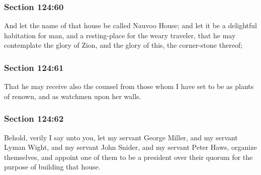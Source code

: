 	\subsubsection{Section 124:60} %
		\label{DC124-60}

		And let the name of that house be called Nauvoo House; and let it be a delightful habitation for man, and a resting-place for the weary traveler, that he may contemplate the glory of Zion, and the glory of this, the corner-stone thereof;


	\subsubsection{Section 124:61} %
		\label{DC124-61}

		That he may receive also the counsel from those whom I have set to be as plants of renown, and as watchmen upon her walls.


	\subsubsection{Section 124:62} %
		\label{DC124-62}

		Behold, verily I say unto you, let my servant George Miller, and my servant Lyman Wight, and my servant John Snider, and my servant Peter Haws, organize themselves, and appoint one of them to be a president over their quorum for the purpose of building that house.


